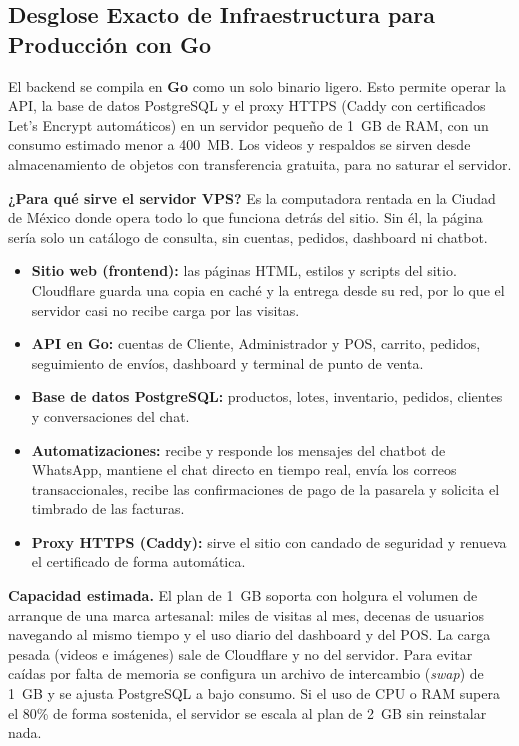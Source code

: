 \documentclass[11pt,letterpaper]{article}
\begin{document}
\subsection{Desglose Exacto de Infraestructura para Producción con Go}
\label{sec:infra}

El backend se compila en \textbf{Go} como un solo binario ligero. Esto permite operar la API, la base de datos PostgreSQL y el proxy HTTPS (Caddy con certificados Let's Encrypt automáticos) en un servidor pequeño de 1~GB de RAM, con un consumo estimado menor a 400~MB. Los videos y respaldos se sirven desde almacenamiento de objetos con transferencia gratuita, para no saturar el servidor.

\noindent\textbf{¿Para qué sirve el servidor VPS?} Es la computadora rentada en la Ciudad de México donde opera todo lo que funciona detrás del sitio. Sin él, la página sería solo un catálogo de consulta, sin cuentas, pedidos, dashboard ni chatbot.

\begin{itemize}[leftmargin=1.5cm]
    \item \textbf{Sitio web (frontend):} las páginas HTML, estilos y scripts del sitio. Cloudflare guarda una copia en caché y la entrega desde su red, por lo que el servidor casi no recibe carga por las visitas.
    \item \textbf{API en Go:} cuentas de Cliente, Administrador y POS, carrito, pedidos, seguimiento de envíos, dashboard y terminal de punto de venta.
    \item \textbf{Base de datos PostgreSQL:} productos, lotes, inventario, pedidos, clientes y conversaciones del chat.
    \item \textbf{Automatizaciones:} recibe y responde los mensajes del chatbot de WhatsApp, mantiene el chat directo en tiempo real, envía los correos transaccionales, recibe las confirmaciones de pago de la pasarela y solicita el timbrado de las facturas.
    \item \textbf{Proxy HTTPS (Caddy):} sirve el sitio con candado de seguridad y renueva el certificado de forma automática.
\end{itemize}

\noindent\textbf{Capacidad estimada.} El plan de 1~GB soporta con holgura el volumen de arranque de una marca artesanal: miles de visitas al mes, decenas de usuarios navegando al mismo tiempo y el uso diario del dashboard y del POS. La carga pesada (videos e imágenes) sale de Cloudflare y no del servidor. Para evitar caídas por falta de memoria se configura un archivo de intercambio (\textit{swap}) de 1~GB y se ajusta PostgreSQL a bajo consumo. Si el uso de CPU o RAM supera el 80\% de forma sostenida, el servidor se escala al plan de 2~GB sin reinstalar nada.
\end{document}
